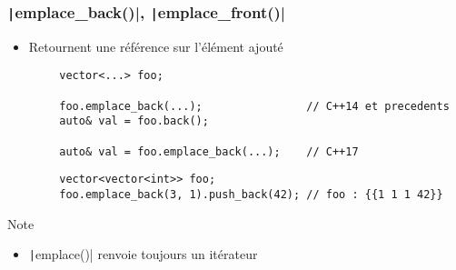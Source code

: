 \documentclass[C++.tex]{subfiles}
\begin{document}
\begin{frame}[fragile]
	\frametitle{\texttt|emplace_back()|, \texttt|emplace_front()|}
	\begin{itemize}
		\item Retournent une référence sur l'élément ajouté
	\end{itemize}

	\begin{verbatim}
		vector<...> foo;

		foo.emplace_back(...);                // C++14 et precedents
		auto& val = foo.back();

		auto& val = foo.emplace_back(...);    // C++17
	\end{verbatim}

	\begin{verbatim}
		vector<vector<int>> foo;
		foo.emplace_back(3, 1).push_back(42); // foo : {{1 1 1 42}}
	\end{verbatim}

	\begin{block}{Note}
		\begin{itemize}
			\item \texttt|emplace()| renvoie toujours un itérateur
		\end{itemize}
	\end{block}

\end{frame}
\end{document}
